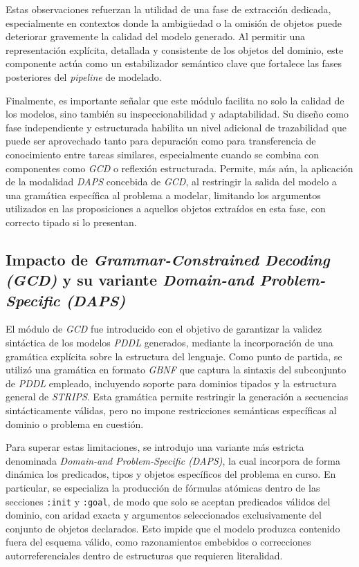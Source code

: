 Estas observaciones refuerzan la utilidad de una fase de extracción dedicada, especialmente en contextos donde la ambigüedad o la omisión de objetos puede deteriorar gravemente la calidad del modelo generado. Al permitir una representación explícita, detallada y consistente de los objetos del dominio, este componente actúa como un estabilizador semántico clave que fortalece las fases posteriores del \textit{pipeline} de modelado.

Finalmente, es importante señalar que este módulo facilita no solo la calidad de los modelos, sino también su inspeccionabilidad y adaptabilidad. Su diseño como fase independiente y estructurada habilita un nivel adicional de trazabilidad que puede ser aprovechado tanto para depuración como para transferencia de conocimiento entre tareas similares, especialmente cuando se combina con componentes como \textit{GCD} o reflexión estructurada. Permite, más aún, la aplicación de la modalidad \textit{DAPS} concebida de \textit{GCD}, al restringir la salida del modelo a una gramática específica al problema a modelar, limitando los argumentos utilizados en las proposiciones a aquellos objetos extraídos en esta fase, con correcto tipado si lo presentan.

\subsection{Impacto de \textit{Grammar-Constrained Decoding (GCD)} y su variante \textit{Domain-and Problem-Specific (DAPS)}}

El módulo de \textit{GCD} fue introducido con el objetivo de garantizar la validez sintáctica de los modelos \textit{PDDL} generados, mediante la incorporación de una gramática explícita sobre la estructura del lenguaje. Como punto de partida, se utilizó una gramática en formato \textit{GBNF} que captura la sintaxis del subconjunto de \textit{PDDL} empleado, incluyendo soporte para dominios tipados y la estructura general de \textit{STRIPS}. Esta gramática permite restringir la generación a secuencias sintácticamente válidas, pero no impone restricciones semánticas específicas al dominio o problema en cuestión.

Para superar estas limitaciones, se introdujo una variante más estricta denominada \textit{Domain-and Problem-Specific (DAPS)}, la cual incorpora de forma dinámica los predicados, tipos y objetos específicos del problema en curso. En particular, se especializa la producción de fórmulas atómicas dentro de las secciones \texttt{:init} y \texttt{:goal}, de modo que solo se aceptan predicados válidos del dominio, con aridad exacta y argumentos seleccionados exclusivamente del conjunto de objetos declarados. Esto impide que el modelo produzca contenido fuera del esquema válido, como razonamientos embebidos o correcciones autorreferenciales dentro de estructuras que requieren literalidad.

